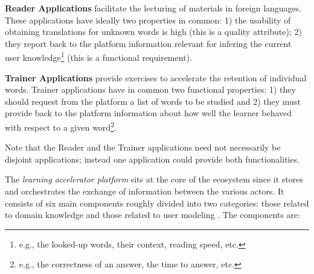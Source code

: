 \begin{description}
	
	\item {\bf Reader Applications} facilitate the lecturing of materials in foreign languages. These applications have ideally two properties in common: 
		1) the usability of obtaining translations for unknown words 
		is high (this is a quality attribute); 
		2) they report back to the platform information relevant for infering the current user knowledge\footnote{e.g., the looked-up words, their context, reading speed, etc.} (this is a functional requirement).

	\item {\bf Trainer Applications} provide exercises to accelerate the retention of individual words. Trainer applications have in common two functional properties: 
		1) they should request from the platform a list of words to be studied and 
		2) they must provide back to the platform information about how well the learner behaved with respect to a given word\footnote{e.g., the correctness of an answer, the time to answer, etc.}.

\end{description}

Note that the Reader and the Trainer applications need not necessarily be disjoint applications; instead one application could provide both functionalities.


The {\em learning accelerator platform} sits at the core of the ecosystem since it stores and orchestrates the exchange of information between the various actors. It consists of six main components roughly divided into two categories: those related to domain knowledge and those related to user modeling
. The components are:


